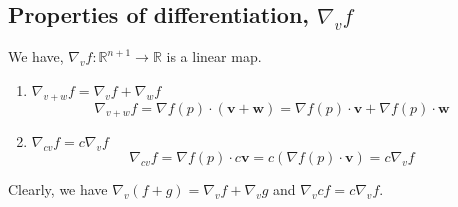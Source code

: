 \subsection{Properties of differentiation, $\nabla_v f$}
We have, $\nabla_v f : \mathbb{R}^{n+1} \to \mathbb{R}$ is a linear map.
\begin{enumerate}
	\item $\nabla_{v+w} f = \nabla_v f + \nabla_w f$
		$$ \nabla_{v+w} f = \nabla f(p) \cdot (\mathbf{v} + \mathbf{w}) = \nabla f(p) \cdot \mathbf{v} + \nabla f(p) \cdot \mathbf{w}$$
	\item $\nabla_{cv} f = c\nabla_v f$
		$$ \nabla_{cv} f = \nabla f(p) \cdot c\mathbf{v} = c\left( \nabla f(p) \cdot \mathbf{v} \right) = c\nabla_v f$$
\end{enumerate}
Clearly, we have $\nabla_v (f+g) = \nabla_v f + \nabla_v g$ and $\nabla_v cf = c\nabla_v f$.

